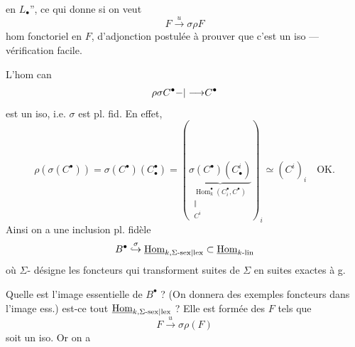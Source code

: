en $L_\bullet$'', ce qui donne si on veut
\[
F\xrightarrow{u}\sigma\rho F
\]
hom fonctoriel en $F$, \uline{}  
d'adjonction postulée
à prouver que c'est un iso --- vérification
facile.

L'hom can
\[
\rho\sigma C^\bullet{-|\longrightarrow}C^\bullet
\]
est un iso, i.e. $\sigma$ est pl. fid. En effet,
\[
\rho(\sigma(C^\bullet))=\sigma(C^\bullet)(C_\bullet^\bullet)
=\left(\underbrace{\sigma(C^\bullet)(C_\bullet^i)}_{\substack{
\operatorname{Hom}_k^\bullet(C_i^\bullet,C^\bullet)\\\Vert\\C^i}}
\right)_i\simeq(C^i)_i\quad\mathrm{OK}.
\]
Ainsi on a une inclusion pl. fidèle
\[
B^\bullet\mathrel{\mathop{\hookrightarrow}\limits^{\sigma}}\underline{\operatorname{Hom}}_{k,\Sigma\text{-{sex|lex}}}
\subset\underline{\operatorname{Hom}}_{k\text{-lin}}
\]
où $\Sigma$- désigne les foncteurs qui transforment
suites de $\Sigma$ en suites exactes à g.

Quelle est l'image essentielle de $B^\bullet$ ?
(On donnera des exemples 
foncteurs dans l'image ess.) est-ce tout
$\underline{\operatorname{Hom}}_{k,\Sigma\text{-{sex|lex}}}$ ? Elle est formée des $F$
tels que
\[
F\xrightarrow{u}\sigma\rho(F)
\]
soit un iso. Or on a

